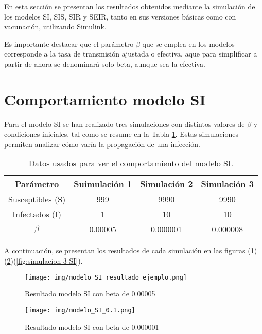 En esta sección se presentan los resultados obtenidos mediante la simulación de los modelos SI, SIS, SIR y SEIR, tanto en sus versiones básicas como con vacunación, utilizando Simulink. 

Es importante destacar que el parámetro $\beta$ que se emplea en los modelos corresponde a la tasa de transmisión ajustada o efectiva, aque para simplificar a partir de ahora se denominará solo beta, aunque sea la efectiva.

\section{Comportamiento modelo SI}
Para el modelo SI se han realizado tres simulaciones con distintos valores de $\beta$ y condiciones iniciales, tal como se resume en la Tabla \ref{tab:resultadosSI}. Estas simulaciones permiten analizar cómo varía la propagación de una infección.
\begin{table}[H]
\centering
\begin{tabular}{|c|c|c|c|}
\hline
\textbf{Parámetro} & \textbf{Suimulación 1} & \textbf{Simulación 2} & \textbf{Simulación 3} \\
\hline
Susceptibles (S) & 999 & 9990 & 9990 \\
\hline
Infectados (I)  & 1 & 10   & 10   \\
\hline
\(\beta\)   & 0.00005     & 0.000001 & 0.000008 \\
\hline
\end{tabular}
\caption{Datos usados para ver el comportamiento del modelo SI.}
\label{tab:resultadosSI}
\end{table}
A continuación, se presentan los resultados de cada simulación en las figuras (\ref{fig:simulación 1 SI})(\ref{fig:simulacion 2 SI})(\ref{fig:simulacion 3 SI}). 
\begin{figure}[H]
    \centering
    \texttt{[image: img/modelo\_SI\_resultado\_ejemplo.png]}
    \caption{Resultado modelo SI con beta de 0.00005}
    \label{fig:simulación 1 SI}
    \vspace{0.5cm} %
\end{figure}

\begin{figure}[H]
    \centering
    \texttt{[image: img/modelo\_SI\_0.1.png]}
    \caption{Resultado modelo SI con beta de 0.000001}
    \label{fig:simulacion 2 SI}
    \vspace{0.5cm} %
\end{figure}


